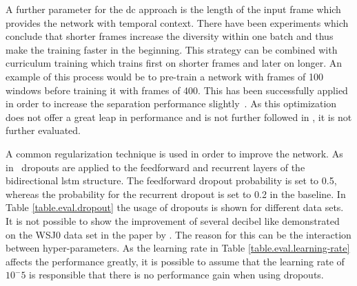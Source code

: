 A further parameter for the \gls{dc} approach is the length of the input frame which provides the network with temporal context. There have been experiments which conclude that shorter frames increase the diversity within one batch and thus make the training faster in the beginning.
This strategy can be combined with curriculum training which trains first on shorter frames and later on longer.
An example of this process would be to pre-train a network with frames of 100 windows before training it with frames of 400. This has been successfully applied in order to increase the separation performance slightly~\cite{Isik2016}.
As this optimization does not offer a great leap in performance \cite{Isik2016} and is not further followed in \cite{Wang2018}, it is not further evaluated.

A common regularization technique is used in order to improve the network. As in~\cite{Isik2016} dropouts are applied to the feedforward and recurrent layers of the bidirectional \gls{lstm} structure. The feedforward dropout probability is set to 0.5, whereas the probability for the recurrent dropout is set to 0.2 in the baseline.
In Table \ref{table.eval.dropout} the usage of dropouts is shown for different data sets. It is not possible to show the improvement of several decibel like demonstrated on the WSJ0 data set in the paper by \cite{Isik2016}. The reason for this can be the interaction between hyper-parameters. As the learning rate in Table \ref{table.eval.learning-rate} affects the performance greatly, it is possible to assume that the learning rate of $10^-5$ is responsible that there is no performance gain when using dropouts.
